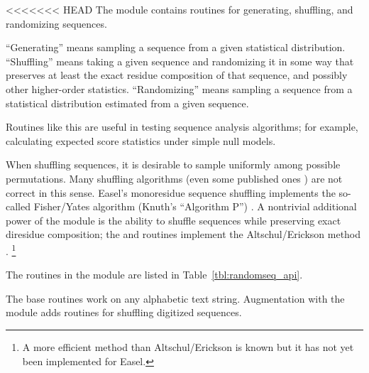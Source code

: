 <<<<<<< HEAD
The  module contains routines for generating,
shuffling, and randomizing sequences.

``Generating'' means sampling a sequence from a given statistical
distribution. ``Shuffling'' means taking a given sequence and
randomizing it in some way that preserves at least the exact residue
composition of that sequence, and possibly other higher-order
statistics. ``Randomizing'' means sampling a sequence from a
statistical distribution estimated from a given sequence.

Routines like this are useful in testing sequence analysis algorithms;
for example, calculating expected score statistics under simple null
models. 


When shuffling sequences, it is desirable to sample uniformly among
possible permutations. Many shuffling algorithms (even some published
ones \citep{Fitch83}) are not correct in this sense. Easel's
monoresidue sequence shuffling implements the so-called Fisher/Yates
algorithm (Knuth's ``Algorithm P'') \citep{Durstenfeld64,Knu-81a}.  A
nontrivial additional power of the module is the ability to shuffle
sequences while preserving exact diresidue composition; the
 and 
routines implement the Altschul/Erickson method
\citep{AltschulErickson86}. \footnote{A more efficient method than
Altschul/Erickson is known \citep{KandelWinkler96,Coward99} but it has
not yet been implemented for Easel.}

The routines in the module are listed in
Table~\ref{tbl:randomseq_api}.

The base routines work on any alphabetic text string.  Augmentation
with the  module adds routines for shuffling
digitized sequences.


